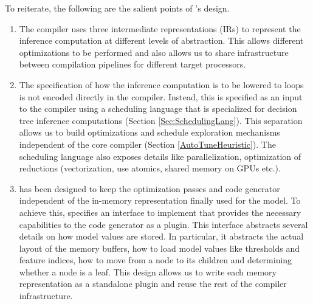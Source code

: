 To reiterate, the following are the salient points of \Treebeard{}'s design.
\begin{enumerate}
  \item The compiler uses three intermediate representations (IRs) to
  represent the inference computation at different levels of abstraction. This
  allows different optimizations to be performed and also allows us to share
  infrastructure between compilation pipelines for different target processors.

  \item The specification of how the inference computation is to be lowered to 
  loops is not encoded directly in the compiler. Instead, this 
  is specified as an input to the compiler using a scheduling language that is 
  specialized for decision tree inference computations (Section \ref{Sec:SchedulingLang}).
  This separation allows us to build optimizations and schedule exploration 
  mechanisms independent of the core compiler (Section \ref{AutoTuneHeuristic}). 
  The scheduling language also exposes details like parallelization, optimization
  of reductions (vectorization, use atomics, shared memory on GPUs etc.).

  \item \Treebeard{} has been designed to keep the optimization passes and code 
  generator independent of the in-memory representation finally used for the model. To achieve 
  this, \Treebeard{} specifies an interface to implement that provides the necessary 
  capabilities to the code generator as a plugin. This interface abstracts several details
  on how model values are stored. In particular, it abstracts the actual layout of 
  the memory buffers, how to load model values like thresholds and feature indices, how 
  to move from a node to its children and determining whether a node is a leaf.
  This design allows us to write each memory representation as a standalone plugin 
  and reuse the rest of the compiler infrastructure.
\end{enumerate}